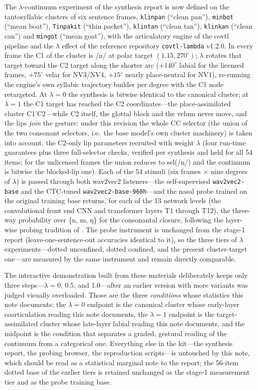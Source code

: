 \documentclass[11pt,a4paper]{article}
\newcommand{\sampa}[1]{\texttt{#1}}
\newcommand{\lam}{\lambda}
\begin{document}
The $\lam$-continuum experiment of the synthesis report is now
defined on the tautosyllabic clusters of six sentence frames,
\sampa{klinpan} (``clean pan''), \sampa{minbot} (``mean boat''),
\sampa{Tinpakit} (``thin packet''), \sampa{klintan} (``clean tan''),
\sampa{klinkan} (``clean can'') and \sampa{mingot} (``mean goat''),
with the articulatory engine of the covtl pipeline \citep{berthommier2026}
and the $\lam$ effect of the reference repository
\texttt{covtl-lambda} v1.2.0. In every frame the C1 of the cluster is
/n/ at polar target $(1.15, 270^{\circ})$; $\lam$ rotates that
target toward the C2 target along the shorter arc ($+140^{\circ}$
labial for the licensed frames, $+75^{\circ}$ velar for NV3/NV4,
$+15^{\circ}$ nearly place-neutral for NV1), re-running the engine's
own syllabic trajectory builder per degree with the C1 node
retargeted. At $\lam=0$ the synthesis is bitwise identical to the
canonical cluster; at $\lam=1$ the C1 target has reached the C2
coordinates---the place-assimilated cluster C1'C2---while C2 itself,
the glottal block and the velum never move, and the lips \emph{join}
the gesture: under this revision the whole CC selector (the union of
the two consonant selectors, i.e.\ the base model's own cluster
machinery) is taken into account, the C2-only lip parameters
recruited with weight $\lam$ (four run-time guarantees plus three
full-selector checks, verified per synthesis and held for all 54
items; for the unlicensed frames the union reduces to sel(/n/) and
the continuum is bitwise the blocked-lip one). Each of
the 54 stimuli (six frames $\times$ nine degrees of $\lam$) is
passed through both
wav2vec2 listeners---the self-supervised \sampa{wav2vec2-base} and the
CTC-tuned \sampa{wav2vec2-base-960h}---and the nasal probe trained
on the original training base returns, for each of the 13 network
levels (the convolutional front end CNN and transformer layers T1
through T12), the three-way probability over \{n, m, ŋ\} for the
consonantal closure, following the layer-wise probing tradition of
\citet{pasad2021}. The probe instrument is unchanged from the
stage-1 report (leave-one-sentence-out accuracies identical to it),
so the three tiers of $\lam$ experiments---dotted unconfined, dotted
confined, and the present cluster-target one---are measured by the
same instrument and remain directly comparable.

The interactive demonstration built from these materials deliberately
keeps only three steps---$\lam=0$, $0.5$, and $1.0$---after an earlier
version with more variants was judged visually overloaded. Those are
the three \emph{conditions} whose statistics this note documents: the
$\lam=0$ endpoint is the canonical cluster whose early-layer
coarticulation reading this note documents, the $\lam=1$ endpoint is
the target-assimilated cluster whose late-layer labial reading this
note documents, and the midpoint is the condition that separates a
graded, gestural reading of the continuum from a categorical one.
Everything else in the kit---the synthesis report, the probing
browser, the reproduction scripts---is untouched by this note, which
should be read as a statistical marginal note to the report; the
56-item dotted base of the earlier tiers is retained unchanged as the
stage-1 measurement tier and as the probe training base.
\end{document}
